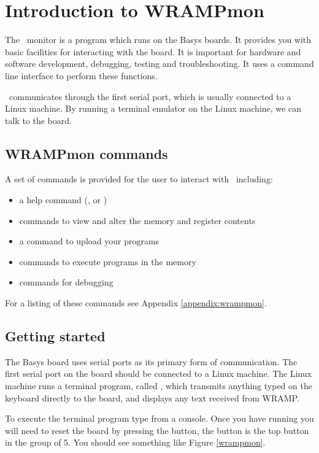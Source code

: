 \section{Introduction to WRAMPmon}
\label{intro:wrampmon}

The \WRAMPmon\ monitor is a program which runs on the Basys boards. It
provides you with basic facilities for interacting with the board.
It is important for hardware and software development, debugging,
testing and troubleshooting. It uses a command line interface to
perform these functions.

\WRAMPmon\ communicates through the first serial port, which is usually
connected to a Linux machine.
By running a terminal emulator on the Linux machine, we can talk to the board.

\subsection{WRAMPmon commands}
A set of commands is provided for the user to interact with \WRAMPmon\
including:

\begin{itemize}
\item a help command (, or )
\item commands to view and alter the memory and register contents
\item a command to upload your programs
\item commands to execute programs in the memory
\item commands for debugging
\end{itemize}

For a listing of these commands see Appendix \ref{appendix:wrampmon}.

\subsection{Getting started}
The Basys board uses serial ports as its primary form of communication.
The first serial port on the board should be connected to a Linux
machine. The Linux machine runs a terminal program, called
, which transmits anything typed on the keyboard
directly to the board, and displays any text received from WRAMP.

To execute the terminal program type  from a console.
Once you have \src{remote} running you will need to reset the
board by pressing the  button, the \src{RESET} button is the
top button in the group of 5. 
You should see something like Figure \ref{wrampmon}.

